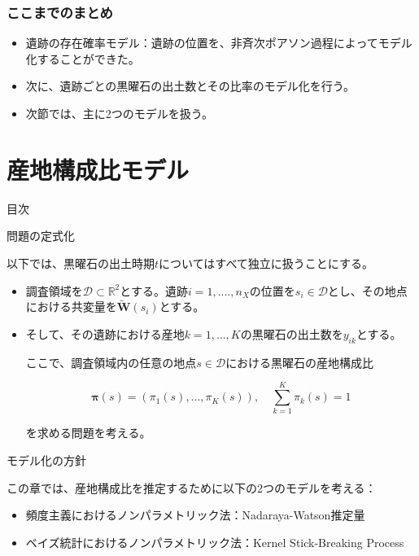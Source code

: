 \documentclass[xelatex, 8pt]{beamer}
\theoremstyle{plain}
\theoremstyle{definition}
\begin{document}
\begin{frame}\frametitle{ここまでのまとめ}
\begin{itemize}
    \item 遺跡の存在確率モデル：遺跡の位置を、非斉次ポアソン過程によってモデル化することができた。
    \item 次に、遺跡ごとの黒曜石の出土数とその比率のモデル化を行う。
    \vspace{3mm}
    \item 次節では、主に2つのモデルを扱う。
    \end{itemize}
\end{frame}

\section{産地構成比モデル}

\begin{frame}
{\Large 目次}
 \tableofcontents[currentsection]
\end{frame}

\begin{frame}{問題の定式化}

以下では、黒曜石の出土時期$t$についてはすべて独立に扱うことにする。

\begin{itemize}
\item 調査領域を$\mathcal{D} \subset \mathbb{R}^2$とする。遺跡$i = 1, ...., n_{X}$の位置を$s_i \in \mathcal{D}$とし、その地点における共変量を$\tilde{\boldsymbol{W}}(s_i)$とする。
\item そして、その遺跡における産地$k=1, \ldots, K$の黒曜石の出土数を$y_{ik}$とする。

\vspace{2mm}

ここで、調査領域内の任意の地点$s \in \mathcal{D}$における黒曜石の産地構成比

$$
\boldsymbol{\pi}(s) = (\pi_1(s), \ldots , \pi_{K}(s)), \quad \sum_{k=1}^{K}\pi_k(s) = 1$$

を求める問題を考える。
\end{itemize}
\end{frame}

\begin{frame}{モデル化の方針}

この章では、産地構成比を推定するために以下の2つのモデルを考える：

\begin{itemize}
    \item 頻度主義におけるノンパラメトリック法：Nadaraya-Watson推定量
    \item ベイズ統計におけるノンパラメトリック法：Kernel Stick-Breaking Process
\end{itemize}

\end{frame}
\end{document}
